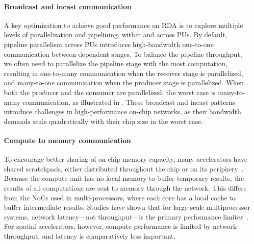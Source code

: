 \paragraph{Broadcast and incast communication} 
A key optimization to achieve good performance on RDA is to explore multiple levels
of parallelization and pipelining, within and across PUs.
By default, pipeline parallelism across PUs introduces high-bandwidth one-to-one communication between dependent stages.
To balance the pipeline throughput, we often need to parallelize the pipeline stage with the most
computation, resulting in one-to-many communication when the receiver stage is parallelized, and
many-to-one communication when the producer stage is parallelized.
When both the producer and the consumer are parallelized, 
the worst case is many-to-many communication, as illustrated in .
These broadcast and incast patterns introduce challenges in high-performance on-chip networks, as
their bandwidth demands scale quadratically with their chip size in the worst case.

\paragraph{Compute to memory communication}
To encourage better sharing of on-chip memory capacity, many accelerators have shared scratchpads, either distributed throughout the chip or on its periphery~\cite{plasticine, brainwave, streamdataflow}.
Because the compute unit has no local memory to buffer temporary results, the results of all computations are sent to memory through the network.
This differs from the NoCs used in multi-processors, where each core has a local cache to buffer intermediate results.
Studies have shown that for large-scale multiprocessor systems, network latency---not throughput---is the primary performance limiter~\cite{noc}.
For spatial accelerators, however, compute performance is limited by network throughput, and latency is comparatively less important.

